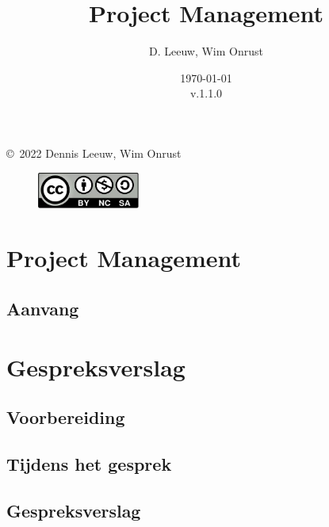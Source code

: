 \documentclass[a4paper,12pt,twoside,openright,titlepage]{book}
\author{D. Leeuw, Wim Onrust}
\title{Project Management}
\date{\today\\v.1.1.0}
\begin{document}

\maketitle

\copyright\ 2022 Dennis Leeuw, Wim Onrust\\

\begin{figure}
\includegraphics[width=0.3\textwidth]{CC-BY-SA-NC.png}
\end{figure}

\bigskip




\frontmatter
%
%

\tableofcontents

\mainmatter

\chapter{Project Management}

\section{Aanvang}


\chapter{Gespreksverslag}

\section{Voorbereiding}

\section{Tijdens het gesprek}

\section{Gespreksverslag}

\end{document}
